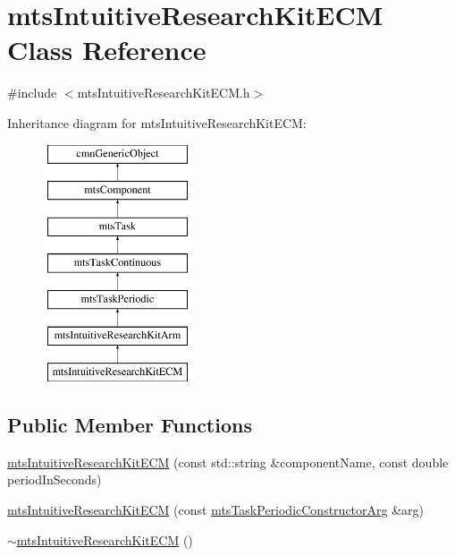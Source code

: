 \hypertarget{classmts_intuitive_research_kit_e_c_m}{}\section{mts\+Intuitive\+Research\+Kit\+E\+C\+M Class Reference}
\label{classmts_intuitive_research_kit_e_c_m}


{\ttfamily \#include $<$mts\+Intuitive\+Research\+Kit\+E\+C\+M.\+h$>$}

Inheritance diagram for mts\+Intuitive\+Research\+Kit\+E\+C\+M\+:\begin{figure}[H]
\begin{center}
\leavevmode
\includegraphics[height=7.000000cm]{da/db3/classmts_intuitive_research_kit_e_c_m}
\end{center}
\end{figure}
\subsection*{Public Member Functions}
\begin{DoxyCompactItemize}
\item 
\hyperlink{classmts_intuitive_research_kit_e_c_m_a0c5ed41167c02448d560e8536f24f29f}{mts\+Intuitive\+Research\+Kit\+E\+C\+M} (const std\+::string \&component\+Name, const double period\+In\+Seconds)
\item 
\hyperlink{classmts_intuitive_research_kit_e_c_m_a3d4a1e5438c623e559c9d43b4d6c0a27}{mts\+Intuitive\+Research\+Kit\+E\+C\+M} (const \hyperlink{classmts_task_periodic_constructor_arg}{mts\+Task\+Periodic\+Constructor\+Arg} \&arg)
\item 
\hyperlink{classmts_intuitive_research_kit_e_c_m_a756440f373892c2b1dac2ba9f5178c97}{$\sim$mts\+Intuitive\+Research\+Kit\+E\+C\+M} ()
\end{DoxyCompactItemize}

